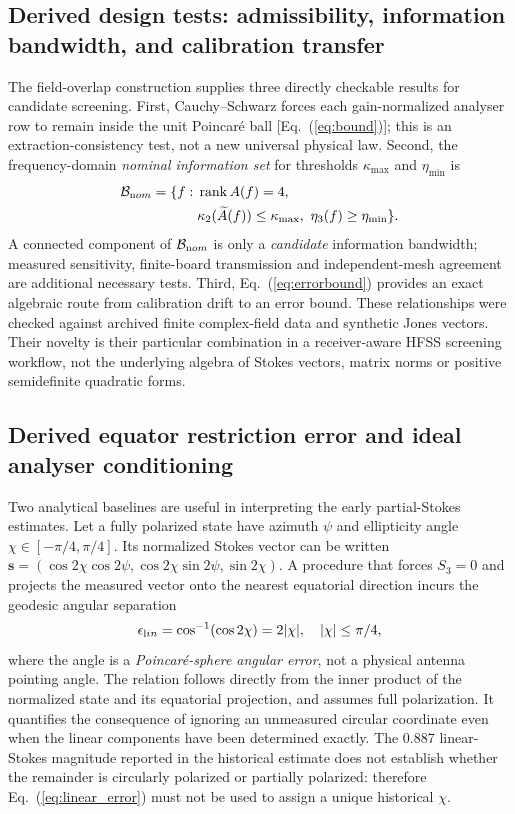 \documentclass{ieeeaccess}
\begin{document}
\subsection{Derived design tests: admissibility, information bandwidth, and calibration transfer}
The field-overlap construction supplies three directly checkable results for candidate screening. First, Cauchy--Schwarz forces each gain-normalized analyser row to remain inside the unit Poincar\'e ball [Eq.~(\ref{eq:bound})]; this is an extraction-consistency test, not a new universal physical law. Second, the frequency-domain \emph{nominal information set} for thresholds $\kappa_{\max}$ and $\eta_{\min}$ is
\begin{equation}
\begin{split}
\mathcal B_{\rm nom}=\{f:\;&\operatorname{rank} A(f)=4,\\
&\kappa_2(\widetilde A(f))\le\kappa_{\max},\ \eta_3(f)\ge\eta_{\min}\}.
\end{split}
\label{eq:bandgate}
\end{equation}
A connected component of $\mathcal B_{\rm nom}$ is only a \emph{candidate} information bandwidth; measured sensitivity, finite-board transmission and independent-mesh agreement are additional necessary tests. Third, Eq.~(\ref{eq:errorbound}) provides an exact algebraic route from calibration drift to an error bound. These relationships were checked against archived finite complex-field data and synthetic Jones vectors. Their novelty is their particular combination in a receiver-aware HFSS screening workflow, not the underlying algebra of Stokes vectors, matrix norms or positive semidefinite quadratic forms.


\subsection{Derived equator restriction error and ideal analyser conditioning}
Two analytical baselines are useful in interpreting the early partial-Stokes estimates. Let a fully polarized state have azimuth $\psi$ and ellipticity angle $\chi\in[-\pi/4,\pi/4]$. Its normalized Stokes vector can be written $\boldsymbol s=(\cos2\chi\cos2\psi,\cos2\chi\sin2\psi,\sin2\chi)$. A procedure that forces $S_3=0$ and projects the measured vector onto the nearest equatorial direction incurs the geodesic angular separation
\begin{equation}
\epsilon_{\rm lin}=\cos^{-1}(\cos 2\chi)=2|\chi|,\quad |\chi|\le\pi/4,
\label{eq:linear_error}
\end{equation}
where the angle is a \emph{Poincar\'e-sphere angular error}, not a physical antenna pointing angle. The relation follows directly from the inner product of the normalized state and its equatorial projection, and assumes full polarization. It quantifies the consequence of ignoring an unmeasured circular coordinate even when the linear components have been determined exactly. The 0.887 linear-Stokes magnitude reported in the historical estimate does not establish whether the remainder is circularly polarized or partially polarized: therefore Eq.~(\ref{eq:linear_error}) must not be used to assign a unique historical $\chi$.
\end{document}
